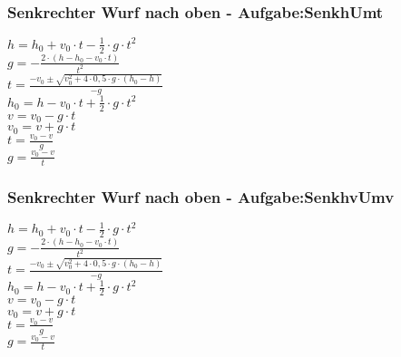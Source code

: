 \subsubsection{Senkrechter Wurf nach oben  - Aufgabe:SenkhUmt} 
\begin{minipage}{0.45\textwidth} 
$ h = h_{0}  + v_{0} \cdot t - \frac{1}{2}\cdot g\cdot t^{2} $\\ 
$ g = - \frac{2\cdot (h - h_{0}  - v_{0} \cdot t)}{     t^{2} } $\\ 
$ t = \frac{-v_{0}  \pm \sqrt{v_{0} ^{2} +4\cdot 0,5\cdot g\cdot (h_{0}  -h)}}{      -g} $\\ 
$ h_{0}  = h - v_{0} \cdot t + \frac{1}{2}\cdot g\cdot t^{2} $\\ 
$ v = v_{0}  - g\cdot t $\\ 
$ v_{0}  = v + g\cdot t $\\ 
$ t = \frac{v_{0} -v}{  g} $\\ 
$ g = \frac{v_{0}  - v}{  t} $\\ 
\end{minipage} 
\begin{minipage}{0.45\textwidth} 
 
\end{minipage} 
\subsubsection{Senkrechter Wurf nach oben  - Aufgabe:SenkhvUmv} 
\begin{minipage}{0.45\textwidth} 
$ h = h_{0}  + v_{0} \cdot t - \frac{1}{2}\cdot g\cdot t^{2} $\\ 
$ g = - \frac{2\cdot (h - h_{0}  - v_{0} \cdot t)}{     t^{2} } $\\ 
$ t = \frac{-v_{0}  \pm \sqrt{v_{0} ^{2} +4\cdot 0,5\cdot g\cdot (h_{0}  -h)}}{      -g} $\\ 
$ h_{0}  = h - v_{0} \cdot t + \frac{1}{2}\cdot g\cdot t^{2} $\\ 
$ v = v_{0}  - g\cdot t $\\ 
$ v_{0}  = v + g\cdot t $\\ 
$ t = \frac{v_{0} -v}{  g} $\\ 
$ g = \frac{v_{0}  - v}{  t} $\\ 
\end{minipage} 
\begin{minipage}{0.45\textwidth} 
 
\end{minipage} 

